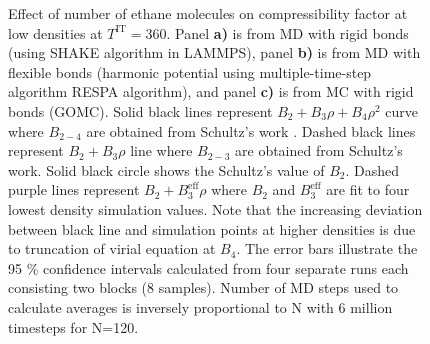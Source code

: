 \documentclass[5p,times]{elsarticle}
\begin{document}
\begin{figure}
\caption{ Effect of number of ethane molecules on compressibility factor at low densities at $T^{\mathrm{IT}}=360$. Panel \textbf{a)} is from MD with rigid bonds (using SHAKE algorithm in LAMMPS), panel \textbf{b)} is from MD with flexible bonds (harmonic potential using multiple-time-step algorithm RESPA \cite{tuckerman1992} algorithm), and panel \textbf{c)} is from MC with rigid bonds (GOMC). 
Solid black lines represent $B_2+B_3 \rho+B_4 \rho^2$ curve where $B_{2-4}$ are obtained from Schultz's work \cite{Schultz2010a}. Dashed black lines represent $B_2+B_3 \rho$ line where $B_{2-3}$ are obtained from Schultz's work. Solid black circle shows the Schultz's value of $B_2$. Dashed purple lines represent $B_2+B_3^\mathrm{eff}\rho$ where $B_2$ and $B_3^\mathrm{eff}$ are fit to four lowest density simulation values. Note that the increasing  deviation between black line and simulation points at higher densities is due to truncation of virial equation at $B_4$. The error bars illustrate the 95 \% confidence intervals calculated from four separate runs each consisting two blocks (8 samples). Number of MD steps used to calculate averages is inversely proportional to N with 6 million timesteps for N=120.
}
\label{fig:FSE_TraPPE_C2_abc}
\end{figure}
\end{document}
